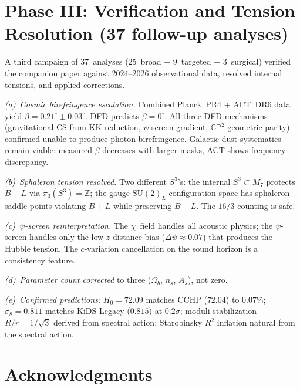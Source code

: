 \documentclass[aps,prd,twocolumn,superscriptaddress,nofootinbib]{revtex4-2}
\newcommand{\CP}{\mathbb{CP}}
\newcommand{\Sph}{S}
\begin{document}
\section{Phase III: Verification and Tension Resolution
(37 follow-up analyses)}
\label{sec:phase3}

A third campaign of 37~analyses (25~broad + 9~targeted
+ 3~surgical) verified the companion paper against
2024--2026 observational data, resolved internal
tensions, and applied corrections.

\emph{(a)~Cosmic birefringence escalation.}
Combined Planck~PR4 + ACT~DR6 data yield
$\beta = 0.21^\circ\pm 0.03^\circ$. DFD predicts
$\beta=0^\circ$. All three DFD mechanisms (gravitational
CS from KK reduction, $\psi$-screen gradient,
$\CP^2$ geometric parity) confirmed unable to produce
photon birefringence. Galactic dust systematics remain
viable: measured $\beta$ decreases with larger masks,
ACT shows frequency discrepancy.

\emph{(b)~Sphaleron tension resolved.}
Two different $\Sph^3$'s: the internal
$\Sph^3\subset M_7$ protects $B{-}L$ via
$\pi_3(\Sph^3)=\mathbb{Z}$; the gauge
$\mathrm{SU}(2)_L$ configuration space has sphaleron
saddle points violating $B{+}L$ while preserving
$B{-}L$. The $16/3$ counting is safe.

\emph{(c)~$\psi$-screen reinterpretation.}
The $\chi$~field handles all acoustic physics;
the $\psi$-screen handles only the low-$z$ distance
bias ($\Delta\psi\approx 0.07$) that produces the
Hubble tension. The $c$-variation cancellation on the
sound horizon is a consistency feature.

\emph{(d)~Parameter count corrected} to three
($\Omega_b$, $n_s$, $A_s$), not zero.

\emph{(e)~Confirmed predictions:}
$H_0 = 72.09$ matches CCHP ($72.04$) to $0.07\%$;
$\sigma_8 = 0.811$ matches KiDS-Legacy ($0.815$) at
$0.2\sigma$; moduli stabilization $R/r = 1/\sqrt{3}$
derived from spectral action; Starobinsky $R^2$
inflation natural from the spectral action.

\section*{Acknowledgments}
\end{document}
